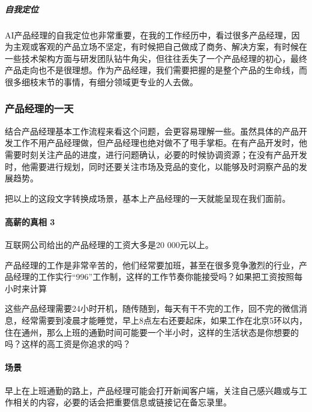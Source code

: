 \documentclass[letterpaper,10pt,english]{sphinxmanual}
\begin{document}
\subparagraph{自我定位}
\label{\detokenize{chapter_introduction/ability:id18}}
AI产品经理的自我定位也非常重要，在我的工作经历中，看过很多产品经理，因为主观或客观的产品立场不坚定，有时候把自己做成了商务、解决方案，有时候在一些技术架构方面与研发团队钻牛角尖，但往往丢失了一个产品经理的初心，最终产品走向也不是很理想。作为产品经理，我们需要把握的是整个产品的生命线，而很多细枝末节的事情，有细分领域更专业的人去做。


\subsubsection{产品经理的一天}
\label{\detokenize{chapter_introduction/1Day:id1}}\label{\detokenize{chapter_introduction/1Day::doc}}
结合产品经理基本工作流程来看这个问题，会更容易理解一些。虽然具体的产品开发工作不用产品经理做，但产品经理也绝对做不了甩手掌柜。在有产品开发时，他需要时刻关注产品的进度，进行问题确认，必要的时候协调资源；在没有产品开发时，他需要进行规划，同时还要关注市场及竞品的变化，以能够及时洞察产品的发展趋势。

把以上的这段文字转换成场景，基本上产品经理的一天就能呈现在我们面前。


\paragraph{高薪的真相 3\sphinxfootnotemark[346]}
\label{\detokenize{chapter_introduction/1Day:id2}}%
\begin{footnotetext}[346]\sphinxAtStartFootnote
{}
%
\end{footnotetext}\ignorespaces 
互联网公司给出的产品经理的工资大多是20 000元以上。

产品经理的工作是非常辛苦的，他们经常要加班，甚至在很多竞争激烈的行业，产品经理的工作实行“996”工作制，这样的工作节奏你能接受吗？如果把工资按照每小时来计算

这些产品经理需要24小时开机，随传随到，每天有干不完的工作，回不完的微信消息，经常需要到凌晨才能睡觉，早上8点左右还要起床，如果工作在北京5环以内，住在通州，那么上班的通勤时间可能要一个半小时，这样的生活状态是你想要的吗？这样的高工资是你追求的吗？


\paragraph{场景}
\label{\detokenize{chapter_introduction/1Day:id3}}
早上在上班通勤的路上，产品经理可能会打开新闻客户端，关注自己感兴趣或与工作相关的内容，必要的话会把重要信息或链接记在备忘录里。
\end{document}
